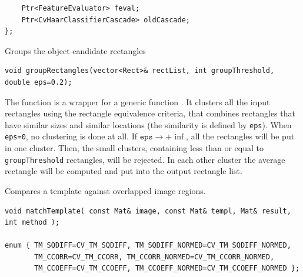 \begin{description}
\begin{lstlisting}
    Ptr<FeatureEvaluator> feval;
    Ptr<CvHaarClassifierCascade> oldCascade;
};
\end{lstlisting}

\label{groupRectangles}
Groups the object candidate rectangles

\begin{lstlisting}
void groupRectangles(vector<Rect>& rectList, int groupThreshold, double eps=0.2);
\end{lstlisting}
\begin{description}
\end{description}

The function is a wrapper for a generic function . It clusters all the input rectangles using the rectangle equivalence criteria, that combines rectangles that have similar sizes and similar locations (the similarity is defined by \texttt{eps}). When \texttt{eps=0}, no clustering is done at all. If $\texttt{eps}\rightarrow +\inf$, all the rectangles will be put in one cluster. Then, the small clusters, containing less than or equal to \texttt{groupThreshold} rectangles, will be rejected. In each other cluster the average rectangle will be computed and put into the output rectangle list.  

\label{matchTemplate}
Compares a template against overlapped image regions.

\begin{lstlisting}
void matchTemplate( const Mat& image, const Mat& templ, Mat& result, int method );

enum { TM_SQDIFF=CV_TM_SQDIFF, TM_SQDIFF_NORMED=CV_TM_SQDIFF_NORMED,
       TM_CCORR=CV_TM_CCORR, TM_CCORR_NORMED=CV_TM_CCORR_NORMED,
       TM_CCOEFF=CV_TM_CCOEFF, TM_CCOEFF_NORMED=CV_TM_CCOEFF_NORMED };
\end{lstlisting}
\begin{description}
\end{description}


\end{description}
